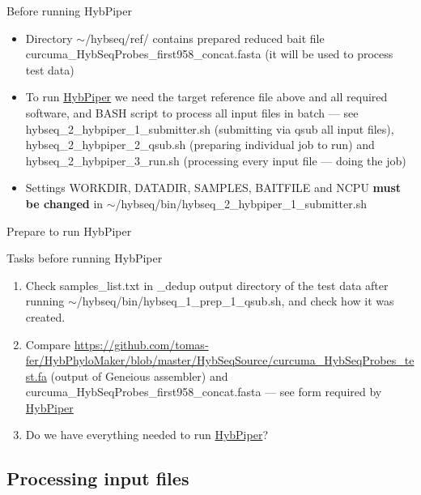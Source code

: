 \documentclass[compress,  xelatex, 11pt, xcolor=x11names, aspectratio=169,
	hyperref={
		bookmarks=true,
		unicode=true,
		colorlinks=true,
		pdftitle={HybSeq course},
		plainpages=false,
		pdfauthor={Vojtech Zeisek},
		pdfsubject={Practical processing of HybSeq target enrichment sequencing data on computing grids like MetaCentrum},
		pdfcreator={XeLaTeX},
		pdfkeywords={BASH, command line, GNU, HybSeq, Linux, MetaCentrum, sequencing shell, target enrichment},
		linkcolor=Turquoise4, %
		anchorcolor=DodgerBlue4, %
		citecolor=DodgerBlue4, %
		filecolor=DodgerBlue4, %
		menucolor=Tan4, %
		urlcolor=DarkOliveGreen4 %
		},
	url={hyphens, lowtilde} %
	]{beamer}
\renewcommand{\texttt}[1]{\colorbox{Cornsilk2}{{\ttfamily #1}}}
\renewcommand{\alert}[1]{\textcolor{OrangeRed3}{#1}}
\begin{document}
\begin{frame}{Before running HybPiper}
	\begin{itemize}
		\item Directory \texttt{$\sim$/hybseq/ref/} contains prepared reduced bait file \texttt{curcuma\_HybSeqProbes\_first958\_concat.fasta} (it will be used to process test data)
		\item To run \href{https://github.com/mossmatters/HybPiper}{HybPiper} we need the target reference file above and all required software, and BASH script to process all input files in batch --- see \texttt{hybseq\_2\_hybpiper\_1\_submitter.sh} (submitting via \texttt{qsub} all input files), \texttt{hybseq\_2\_hybpiper\_2\_qsub.sh} (preparing individual job to run) and \texttt{hybseq\_2\_hybpiper\_3\_run.sh} (processing every input file --- doing the job)
		\item \alert{Settings} \texttt{WORKDIR}, \texttt{DATADIR}, \texttt{SAMPLES}, \texttt{BAITFILE} and \texttt{NCPU} \textbf{must be changed} in \texttt{$\sim$/hybseq/bin/hybseq\_2\_hybpiper\_1\_submitter.sh}
	\end{itemize}
\end{frame}

\begin{frame}{Prepare to run HybPiper}
	\begin{exampleblock}{Tasks before running HybPiper}
		\begin{enumerate}
			\item Check \texttt{samples\_list.txt} in \texttt{2\_dedup} output directory of the test data after running \texttt{$\sim$/hybseq/bin/hybseq\_1\_prep\_1\_qsub.sh}, and check how it was created.
			\item Compare \url{https://github.com/tomas-fer/HybPhyloMaker/blob/master/HybSeqSource/curcuma_HybSeqProbes_test.fa} (output of Geneious assembler) and \texttt{curcuma\_HybSeqProbes\_first958\_concat.fasta} --- see form required by \href{https://github.com/mossmatters/HybPiper/wiki\#12-target-file}{HybPiper}
			\item Do we have everything needed to run \href{https://github.com/mossmatters/HybPiper/wiki}{HybPiper}?
		\end{enumerate}
	\end{exampleblock}
\end{frame}

\subsection{Processing input files}
\end{document}
